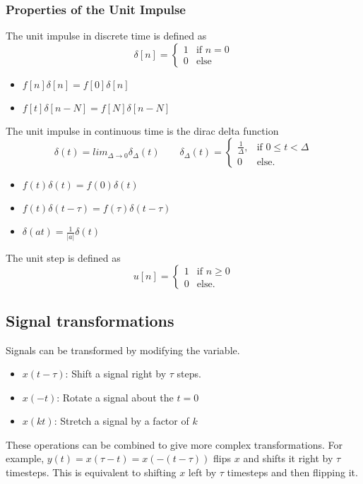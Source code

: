 \subsubsection{Properties of the Unit Impulse}
\begin{definition}
    The unit impulse in discrete time is defined as 
    \[
	  \delta[n] = \begin{cases}
		1 & \text{if } n = 0\\
		0 & \text{else }
	  \end{cases}
    \]
\end{definition}
\begin{itemize}
    \item $f[n]\delta[n] = f[0]\delta[n]$
    \item $f[t]\delta[n-N] = f[N]\delta[n-N]$
\end{itemize}
\begin{definition}
    The unit impulse in continuous time is the dirac delta function
    \[
	  \delta(t)=lim_{\Delta\rightarrow 0}\delta_{\Delta}(t) \qquad
		\delta_{\Delta}(t)=\begin{cases}
			\frac{1}{\Delta}, & \text{if } 0 \leq t < \Delta \\
			0 & \text{else.}
		\end{cases}
    \]
\end{definition}
\begin{itemize}
    \item $f(t)\delta(t) = f(0)\delta(t)$
    \item $f(t)\delta(t-\tau) = f(\tau)\delta(t-\tau)$
    \item $\delta(at) = \frac{1}{|a|}\delta(t)$
\end{itemize}
\begin{definition}
    The unit step is defined as 
    \[
		u[n] = \begin{cases}
		  1 & \text{if } n \geq 0\\
		  0 & \text{else.}
	  \end{cases}
	\]
\end{definition}
\subsection{Signal transformations}
Signals can be transformed by modifying the variable.
\begin{itemize}
    \item $x(t - \tau)$: Shift a signal right by $\tau$ steps.
    \item $x(-t)$: Rotate a signal about the $t=0$
    \item $x(kt)$: Stretch a signal by a factor of $k$
\end{itemize}
These operations can be combined to give more complex transformations.
For example, $y(t) = x(\tau - t) = x(-(t-\tau))$ flips $x$ and shifts it right by $\tau$ timesteps.
This is equivalent to shifting $x$ left by $\tau$ timesteps and then flipping it.
